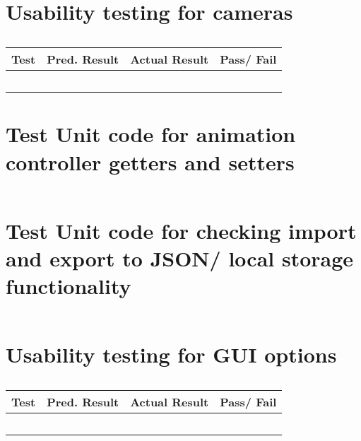 \section{Usability testing for cameras}
\begin{table}[h]
\begin{tabular}{|p{4.5cm}|p{3.5cm}|p{3.5cm}|l|}
\hline
\textbf{Test} & \textbf{Pred. Result} & \textbf{Actual Result} & \textbf{Pass/ Fail}                                                                                                    \\ \hline
    &    &            &     \\ \hline
    &    &            &     \\ \hline
    &    &            &     \\ \hline
    &    &            &     \\ \hline
    &    &            &     \\ \hline
\end{tabular}
\label{test:cameras}
\caption{}
\end{table}

\section{Test Unit code for animation controller getters and setters}
\label{test:animation}
\begin{figure}[h!]
\caption{}
\begin{lstlisting}
\end{lstlisting}
\end{figure}

\section{Test Unit code for checking import and export to JSON/ local storage functionality}
\label{test:save}
\begin{figure}[h!]
\caption{}
\begin{lstlisting}
\end{lstlisting}
\end{figure}

\section{Usability testing for GUI options}
\begin{table}[h]
\begin{tabular}{|p{4.5cm}|p{3.5cm}|p{3.5cm}|l|}
\hline
\textbf{Test} & \textbf{Pred. Result} & \textbf{Actual Result} & \textbf{Pass/ Fail}                                                                                                    \\ \hline
    &    &            &     \\ \hline
    &    &            &     \\ \hline
    &    &            &     \\ \hline
    &    &            &     \\ \hline
    &    &            &     \\ \hline
\end{tabular}
\label{test:options}
\caption{}
\end{table}

